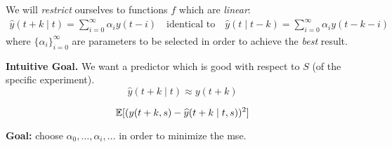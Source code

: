 We will \emph{restrict} ourselves to functions $f$ which are \emph{linear}:
\begin{align*}
	\hat{y}(t + k \mid t)=\sum_{i=0}^{\infty}\alpha_i y(t-i)
	\quad \text{identical to} \quad
	\hat{y}(t \mid t - k)=\sum_{i=0}^{\infty}\alpha_i y(t-k-i)
\end{align*}
where ${\{\alpha_i\}}_{i=0}^\infty$ are parameters to be selected in order to achieve the \emph{best} result.

\textbf{Intuitive Goal.} 
We want a predictor which is good with respect to $S$ (of the specific experiment).
\[
	\hat{y}(t + k \mid t)\approx y(t+k)
\]

\begin{defn}
	\[
		\mathbb{E}[(y(t+k,s)-\widehat{y}(t+k\mid t,s))^2]
	\]
\end{defn}

\textbf{Goal:} choose $\alpha_0,\ldots,\alpha_i,\ldots$ in order to minimize the \gls{mse}.